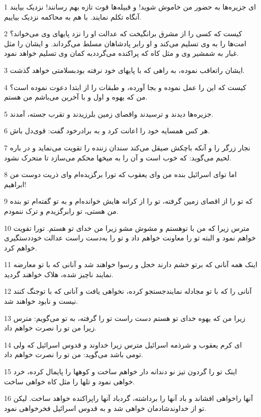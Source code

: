 \par 1 ای جزیره‌ها به حضور من خاموش شوید! و قبیله‌ها قوت تازه بهم رسانند! نزدیک بیایند آنگاه تکلم نمایند. با هم به محاکمه نزدیک بیاییم.
\par 2 کیست که کسی را از مشرق برانگیخت که عدالت او را نزد پایهای وی می‌خواند؟ امت‌ها را به وی تسلیم می‌کند و او رابر پادشاهان مسلط می‌گرداند. و ایشان را مثل غبار به شمشیر وی و مثل کاه که پراکنده می‌گرددبه کمان وی تسلیم خواهد نمود.
\par 3 ایشان راتعاقب نموده، به راهی که با پایهای خود نرفته بودبسلامتی خواهد گذشت.
\par 4 کیست که این را عمل نموده و بجا آورده، و طبقات را از ابتدا دعوت نموده است؟ من که یهوه و اول و با آخرین می‌باشم من هستم.
\par 5 جزیره‌ها دیدند و ترسیدند واقصای زمین بلرزیدند و تقرب جسته، آمدند.
\par 6 هر کس همسایه خود را اعانت کرد و به برادرخود گفت: قوی‌دل باش.
\par 7 نجار زرگر را و آنکه باچکش صیقل می‌کند سندان زننده را تقویت می‌نماید و در باره لحیم می‌گوید: که خوب است و آن را به میخها محکم می‌سازد تا متحرک نشود.
\par 8 اما تو‌ای اسرائیل بنده من و‌ای یعقوب که تورا برگزیده‌ام و‌ای ذریت دوست من ابراهیم!
\par 9 که تو را از اقصای زمین گرفته، تو را از کرانه هایش خوانده‌ام و به تو گفته‌ام تو بنده من هستی، تو رابرگزیدم و ترک ننمودم.
\par 10 مترس زیرا که من با توهستم و مشوش مشو زیرا من خدای تو هستم. تورا تقویت خواهم نمود و البته تو را معاونت خواهم داد و تو را به‌دست راست عدالت خوددستگیری خواهم کرد.
\par 11 اینک همه آنانی که برتو خشم دارند خجل و رسوا خواهند شد و آنانی که با تو معارضه نمایند ناچیز شده، هلاک خواهند گردید.
\par 12 آنانی را که با تو مجادله نمایندجستجو کرده، نخواهی یافت و آنانی که با توجنگ کنند نیست و نابود خواهند شد.
\par 13 زیرا من که یهوه خدای تو هستم دست راست تو را گرفته، به تو می‌گویم: مترس زیرا من تو را نصرت خواهم داد.
\par 14 ‌ای کرم یعقوب و شرذمه اسرائیل مترس زیرا خداوند و قدوس اسرائیل که ولی تومی باشد می‌گوید: من تو را نصرت خواهم داد.
\par 15 اینک تو را گردون تیز نو دندانه دار خواهم ساخت و کوهها را پایمال کرده، خرد خواهی نمود و تلها را مثل کاه خواهی ساخت.
\par 16 آنها راخواهی افشاند و باد آنها را برداشته، گردباد آنها راپراکنده خواهد ساخت. لیکن تو از خداوندشادمان خواهی شد و به قدوس اسرائیل فخرخواهی نمود.
